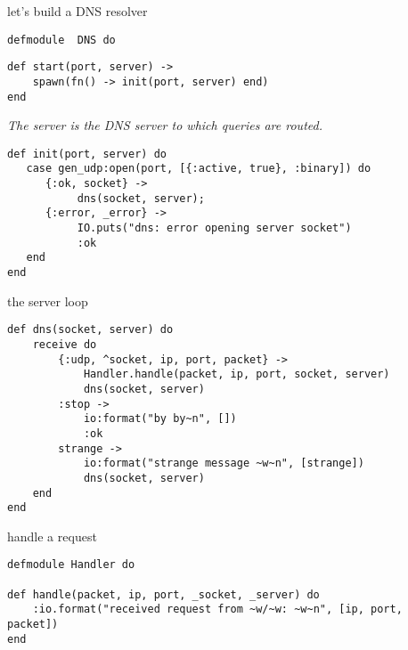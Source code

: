 \begin{frame}[fragile]{let's build a DNS resolver}
 
\pause

\begin{verbatim}
defmodule  DNS do
\end{verbatim}

\begin{verbatim}
def start(port, server) ->
    spawn(fn() -> init(port, server) end)
end
\end{verbatim}

\vspace{10pt}\pause
{\em The server is the DNS server to which queries are routed.}

\pause

\begin{verbatim}
def init(port, server) do
   case gen_udp:open(port, [{:active, true}, :binary]) do
      {:ok, socket} ->
           dns(socket, server);
      {:error, _error} ->
           IO.puts("dns: error opening server socket")
           :ok
   end
end
\end{verbatim}


\end{frame}

\begin{frame}[fragile]{the server loop}

\begin{verbatim}
def dns(socket, server) do
    receive do
        {:udp, ^socket, ip, port, packet} ->
            Handler.handle(packet, ip, port, socket, server)
            dns(socket, server)
        :stop ->
            io:format("by by~n", [])
            :ok
        strange ->
            io:format("strange message ~w~n", [strange])
            dns(socket, server)
    end
end
\end{verbatim}

\end{frame}


\begin{frame}[fragile]{handle a request}

\pause
\begin{verbatim}
defmodule Handler do

def handle(packet, ip, port, _socket, _server) do
    :io.format("received request from ~w/~w: ~w~n", [ip, port, packet])
end
\end{verbatim}

\vspace{20pt}

\end{frame}


